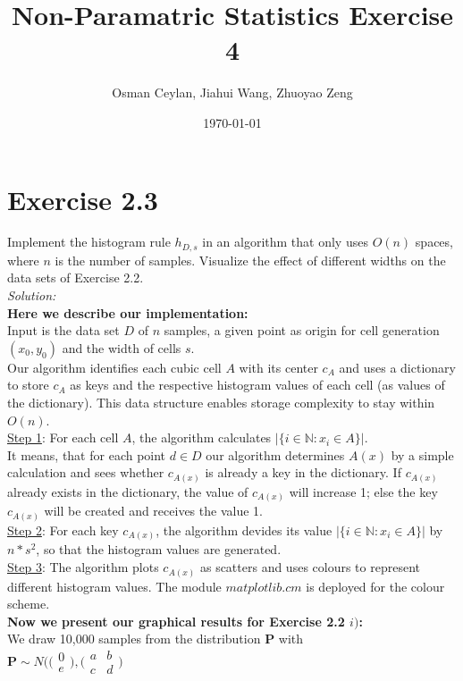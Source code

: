 \documentclass{article}
\title{Non-Paramatric Statistics Exercise 4}
\author{Osman Ceylan, Jiahui Wang, Zhuoyao Zeng}
\date{\today}
\begin{document}
\maketitle

\section*{Exercise 2.3} \vspace*{-1em}
Implement the histogram rule $h_{D,s}$ in an algorithm that only uses $O(n)$ spaces, where $n$ is the number of samples. Visualize the effect of different widths on the data sets of Exercise 2.2.\\
\textit{Solution: }\\
\textbf{Here we describe our implementation:}\\
Input is the data set $D$ of $n$ samples, a given point as origin for cell generation $(x_0,y_0)$ and the width of cells $s$.\\
Our algorithm identifies each cubic cell $A$ with its center $c_A$ and uses a dictionary to store $c_A$ as keys and the respective histogram values of each cell (as values of the dictionary). This data structure enables storage complexity to stay within $O(n)$.\\
\underline{Step 1}: For each cell $A$, the algorithm calculates $|\{ i\in \mathbb{N} : x_i\in A\}|$. \\
It means, that for each point $d \in D$ our algorithm determines $A(x)$ by a simple calculation and sees whether $c_{A(x)}$ is already a key in the dictionary. If $c_{A(x)}$ already exists in the dictionary, the value of $c_{A(x)}$ will increase 1; else the key $c_{A(x)}$ will be created and receives the value 1.\\
\underline{Step 2}: For each key $c_{A(x)}$, the algorithm devides its value $|\{ i\in \mathbb{N} : x_i\in A\}|$ by $n * s^2$, so that the histogram values are generated. \\
\underline{Step 3}: The algorithm plots $c_{A(x)}$ as scatters and uses colours to represent different histogram values. The module $matplotlib.cm$ is deployed for the colour scheme. \\
\textbf{Now we present our graphical results for Exercise 2.2 $i)$:} \\
We draw 10,000 samples from the distribution $\mathbf{P}$ with \\
$\mathbf{P} \sim N ( \bigl(\begin{smallmatrix} 0 \\ e \end{smallmatrix}\bigr), \bigl(\begin{smallmatrix} a & b\\ c & d \end{smallmatrix}\bigr)$
\end{document}
